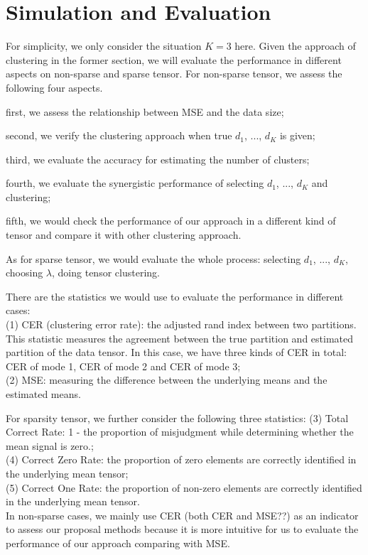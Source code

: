 \documentclass{article}
\begin{document}
\section{Simulation and Evaluation}
For simplicity, we only consider the situation $K=3$ here. 
Given the approach of clustering in the former section, we will evaluate the performance  in different aspects on non-sparse and sparse tensor. For non-sparse tensor, we assess the following four aspects.

first, we assess the relationship between MSE and the data size; 

second, we verify the clustering approach when true $d_1$, ..., $d_K$ is given; 

third, we evaluate the accuracy for estimating the number of clusters; 

fourth, we evaluate the synergistic performance of selecting $d_1$, ..., $d_K$ and clustering; 

fifth, we would check the performance of our approach in a different kind of tensor and compare it with other clustering approach. 

As for sparse tensor, we would evaluate the whole process: selecting $d_1$, ..., $d_K$, choosing $\lambda$, doing tensor clustering.\par 

There are the statistics we would use to evaluate the performance in different cases:\\
(1) CER (clustering error rate): the adjusted rand index between two partitions. This statistic measures the agreement between the true partition and estimated partition of the data tensor. In this case, we have three kinds of CER in total: CER of mode 1, CER of mode 2 and CER of mode 3;\\
(2) MSE: measuring the difference between the underlying means and the estimated means.\par  

For sparsity tensor, we further consider the following three statistics:
(3) Total Correct Rate: 1 - the proportion of misjudgment while determining whether the mean signal is zero.;\\
(4) Correct Zero Rate: the proportion of zero elements are correctly identified in the underlying mean tensor;\\
(5) Correct One Rate: the proportion of non-zero elements are correctly identified in the underlying mean tensor.\\


In non-sparse cases, we mainly use CER (both CER and MSE??) as an indicator to assess our proposal methods because it is more intuitive for us to evaluate the performance of our approach comparing with MSE. 
\end{document}
